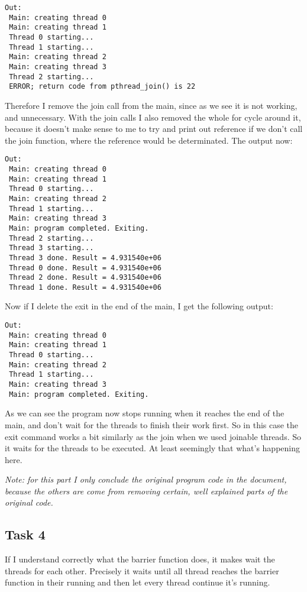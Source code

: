 \begin{lstlisting}[basicstyle=\ttfamily,frame=single]
Out:
 Main: creating thread 0
 Main: creating thread 1
 Thread 0 starting...
 Thread 1 starting...
 Main: creating thread 2
 Main: creating thread 3
 Thread 2 starting...
 ERROR; return code from pthread_join() is 22
\end{lstlisting}
 
Therefore I remove the join call from the main, since as we see it is not working, and unnecessary. With the join calls I also removed the whole for cycle around it, because it doesn't make sense to me to try and print out reference if we don't call the join function, where the reference would be determinated. The output now:

\begin{lstlisting}[basicstyle=\ttfamily,frame=single]
Out:
 Main: creating thread 0
 Main: creating thread 1
 Thread 0 starting...
 Main: creating thread 2
 Thread 1 starting...
 Main: creating thread 3
 Main: program completed. Exiting.
 Thread 2 starting...
 Thread 3 starting...
 Thread 3 done. Result = 4.931540e+06
 Thread 0 done. Result = 4.931540e+06
 Thread 2 done. Result = 4.931540e+06
 Thread 1 done. Result = 4.931540e+06
\end{lstlisting}

Now  if I delete the exit in the end of the main, I get the following output:


\begin{lstlisting}[basicstyle=\ttfamily,frame=single]
Out:
 Main: creating thread 0
 Main: creating thread 1
 Thread 0 starting...
 Main: creating thread 2
 Thread 1 starting...
 Main: creating thread 3
 Main: program completed. Exiting.
\end{lstlisting}

As we can see the program now stops running when it reaches the end of the main, and don't wait for the threads to finish their work first. So in this case the exit command works a bit similarly as the join when we used joinable threads. So it waits for the threads to be executed. At least seemingly that what's happening here.

\textit{Note: for this part I only conclude the original program code in the document, because the others are come from removing certain, well explained parts of the original code.}


\subsection*{Task 4}
If I understand correctly what the barrier function does, it makes wait the threads for each other. Precisely it waits until all thread reaches the barrier function in their running and then let every thread continue it's running.


